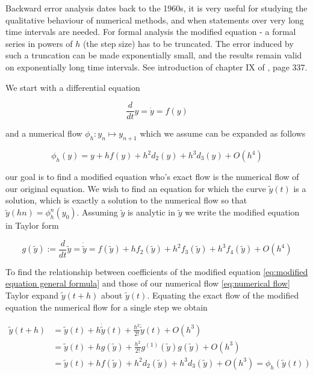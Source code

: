 \documentclass[12pt]{article}
\begin{document}
Backward error analysis dates back to the 1960s, it is very useful for studying the qualitative behaviour of numerical methods, and when statements over very long time intervals are needed. For formal analysis the modified equation - a formal series in powers of $h$ (the step size) has to be truncated. The error induced by such a truncation can be made exponentially small, and the results remain valid on exponentially long time intervals. See introduction of chapter IX of \cite{Numerical}, page 337.

We start with a differential equation 

\begin{equation}\label{eq:exact equation}
    \frac{d}{dt}y = \dot y = f(y)
\end{equation}

and a numerical flow $\phi_h : y_n\mapsto y_{n+1}$ which we assume can be expanded as follows

\begin{equation}\label{eq:numerical flow}
    \phi_h(y) = y + hf(y) + h^2d_2(y) + h^3d_3(y) + O(h^4)
\end{equation}

our goal is to find a modified equation who's exact flow is the numerical flow of our original equation. We wish to find an equation for which the curve $\widetilde y(t)$ is a solution, which is exactly a solution to the numerical flow so that $\widetilde y(hn) = \phi_h^n(y_0)$. Assuming $\dot{\widetilde y}$ is analytic in $\widetilde y$ we write the modified equation in Taylor form

\begin{equation}\label{eq:modified equation general formula} 
    g(\widetilde y) := \frac{d}{dt}\widetilde y = \dot{\widetilde y} = f(\widetilde y) + hf_2(\widetilde y) + h^2f_3(\widetilde y) + h^3f_4(\widetilde y) + O(h^4)
\end{equation}

To find the relationship between coefficients of the modified equation \eqref{eq:modified equation general formula} and those of our numerical flow \eqref{eq:numerical flow} Taylor expand $\widetilde y(t+h)$ about $\widetilde y(t)$. Equating the exact flow of the modified equation the numerical flow for a single step we obtain

\begin{equation}\label{eq:modified and numerical taylor}
    \begin{split}
    \widetilde y(t+h) &= \widetilde y(t) + h\dot{\widetilde y}(t) + \frac{h^2}{2!} \ddot{\widetilde y}(t) + O(h^3)\\
    &= \widetilde y(t) + hg(\widetilde y) + \frac{h^2}{2!}g^{(1)}(\widetilde y)g(\widetilde y) + O(h^3)\\
    &= \widetilde y(t) + hf(\widetilde y) + h^2d_2(\widetilde y) + h^3d_3(\widetilde y) + O(h^3) = \phi_h(\widetilde y(t))
    \end{split}
\end{equation}
\end{document}

